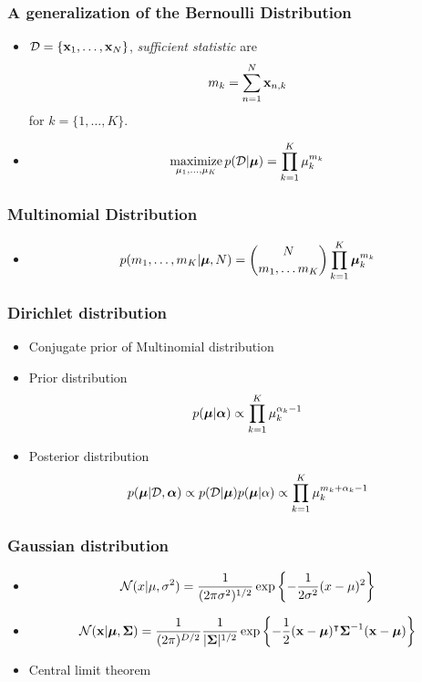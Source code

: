 \documentclass[10pt,mathserif]{beamer}
\begin{document}
\begin{frame}
\frametitle{A generalization of the Bernoulli Distribution}
\begin{itemize}
\item $\mathcal{D} = \{\mathbf{x}_1,\ldots,\mathbf{x}_N\}$, \textit{sufficient statistic} are 
\begin{align}
m_k= \sum_{n=1}^N \mathbf{x}_{n,k}\nonumber
\end{align}
for $k=\{1,\ldots,K\}$.

\item
\begin{align}
    \operatorname*{maximize}_{\mu_1,\ldots,\mu_K} p(\mathcal{D}| \boldsymbol{\mu}) = \prod_{k=1}^K \mu_k^{m_k}\nonumber
\end{align}
\end{itemize}
\end{frame}
\begin{frame}
\frametitle{Multinomial Distribution}
\begin{itemize}
\item 
\begin{align}
p(m_1,\ldots,m_K|\boldsymbol{\mu}, N) = {N \choose m_1,\ldots m_K} \prod_{k=1}^K \boldsymbol{\mu}_k^{m_k} \nonumber
\end{align}
\end{itemize}
\end{frame}

\begin{frame}
\frametitle{Dirichlet distribution}
\begin{itemize}
\item Conjugate prior of Multinomial distribution
\item Prior distribution
\begin{align} 
p(\boldsymbol{\mu}| \boldsymbol{\alpha}) \propto \prod_{k=1}^K \mu_k^{\alpha_k-1} \nonumber
\end{align}
\item Posterior distribution
\begin{align} 
p(\boldsymbol{\mu}| \mathcal{D}, \boldsymbol{\alpha}) \propto p(\mathcal{D} | \boldsymbol{\mu})p(\boldsymbol{\mu} | \alpha) \propto \prod_{k=1}^K \mu_k^{m_k+\alpha_k-1} \nonumber
\end{align}
\end{itemize}
\end{frame}

\begin{frame}
\frametitle{Gaussian distribution}
\begin{itemize}
\item
\begin{align}
\mathcal{N}(x | \mu, \sigma^2) = \frac{1}{(2\pi \sigma^2)^{1/2}}\exp\left\{-\frac{1}{2\sigma^2} (x-\mu)^2 \right\}\nonumber
\end{align}
\item 
\begin{align}
\mathcal{N}(\mathbf{x} | \boldsymbol{\mu}, \boldsymbol{\Sigma}) = \frac{1}{(2\pi)^{D/2}} \frac{1}{|\boldsymbol{\Sigma}|^{1/2}}\exp\left\{-\frac{1}{2} (\mathbf{x}-\boldsymbol{\mu})^\intercal \boldsymbol{\Sigma}^{-1}(\mathbf{x}-\boldsymbol{\mu})\right\}\nonumber
\end{align}
\item Central limit theorem 
\end{itemize}
\end{frame}
\end{document}
